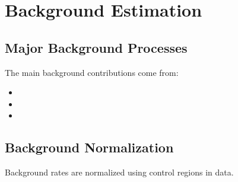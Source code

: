 \section{Background Estimation}
\label{sec:RESULTS_BACKGROUND_ESTIMATION}

\subsection{Major Background Processes}
\label{sec:RESULTS_BACKGROUND_ESTIMATION_MAJOR_BACKGROUND_PROCESSES}

The main background contributions come from:
\begin{itemize}
  \item [Background process 1]
  \item [Background process 2]
  \item [Background process 3]
\end{itemize}

\subsection{Background Normalization}
\label{sec:RESULTS_BACKGROUND_ESTIMATION_BACKGROUND_NORMALIZATION}

Background rates are normalized using control regions in data.

